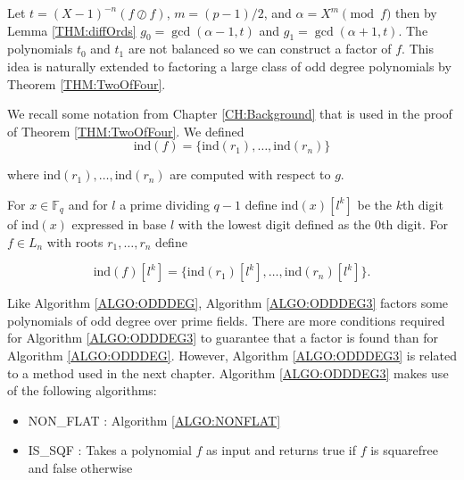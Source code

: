 \documentclass{article}
\theoremstyle{plain}
\theoremstyle{definition}
\def\Fq {{ \mathbb{F} _ {q} }}
\def\ind {{ \mathrm{ind} }}
\begin{document}
		Let $t=(X-1)^{-n}(f \oslash f)$, $m=(p-1)/2$, and $\alpha=X^m \pmod f$ then by Lemma \ref{THM:diffOrds} $g_0=\gcd(\alpha-1,t)$ and $g_1=\gcd(\alpha+1,t)$. The polynomials $t_0$ and $t_1$ are not balanced so we can construct a factor of $f$. This idea is naturally extended to factoring a large class of odd degree polynomials by Theorem \ref{THM:TwoOfFour}.	
		
		We recall some notation from Chapter \ref{CH:Background} that is used in the proof of Theorem \ref{THM:TwoOfFour}. We defined
		    \[ \ind(f)=\{ \ind(r_1),\ldots,\ind(r_n)\} \] 
		
		\noindent where $\ind(r_1),\ldots,\ind(r_n)$ are computed with respect to $g$. 
		
		For $x \in \Fq$ and for $l$ a prime dividing $q-1$ define $\ind(x)[l^k]$ be the $k$th digit of $\ind(x)$ expressed in base $l$ with the lowest digit defined as the 0th digit. For $f \in L_n$ with roots $r_1,\ldots,r_n$ define
		
		\[ \ind(f)[l^k]=\{ \ind(r_1)[l^k],\ldots,\ind(r_n)[l^k] \}. \] 
		
		Like Algorithm \ref{ALGO:ODDDEG}, Algorithm \ref{ALGO:ODDDEG3} factors some polynomials of odd degree over prime fields. There are more conditions required for Algorithm \ref{ALGO:ODDDEG3} to guarantee that a factor is found than for Algorithm \ref{ALGO:ODDDEG}. However, Algorithm \ref{ALGO:ODDDEG3} is related to a method used in the next chapter. Algorithm \ref{ALGO:ODDDEG3} makes use of the following algorithms:
		\begin{itemize}
		    \item NON\_FLAT : Algorithm \ref{ALGO:NONFLAT} 
				\item IS\_SQF : Takes a polynomial $f$ as input and returns true if $f$ is squarefree and false otherwise
		\end{itemize}
		
\end{document}
